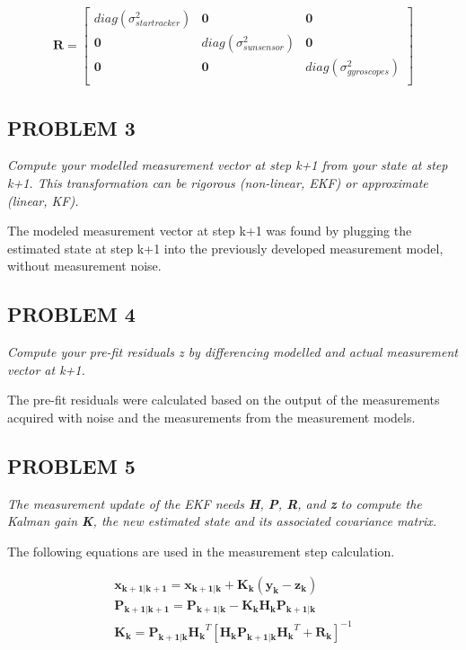 \begin{align*}
    \mathbf{R} = 
    \begin{bmatrix}
        diag(\sigma_{star tracker}^2) & \mathbf{0} & \mathbf{0} \\
        \mathbf{0} & diag(\sigma_{sun sensor}^2) & \mathbf{0} \\
        \mathbf{0} & \mathbf{0} & diag(\sigma_{gyroscopes}^2)\\
    \end{bmatrix}
\end{align*}

\subsection{PROBLEM 3}
\textit{Compute your modelled measurement vector at step k+1 from your state at step k+1. This transformation can be rigorous (non-linear, EKF) or approximate (linear, KF).}

The modeled measurement vector at step k+1 was found by plugging the estimated state at step k+1 into the previously developed measurement model, without measurement noise.

\subsection{PROBLEM 4}
\textit{Compute your pre-fit residuals \textit{z} by differencing modelled and actual measurement vector at k+1.}

The pre-fit residuals were calculated based on the output of the measurements acquired with noise and the measurements from the measurement models.

\subsection{PROBLEM 5}
\textit{The measurement update of the EKF needs \textbf{H}, \textbf{P}, \textbf{R}, and \textbf{z} to compute the Kalman gain \textbf{K}, the new estimated state and its associated covariance matrix.}

The following equations are used in the measurement step calculation.

\begin{align*}
    \mathbf{x_{k+1 | k+1}} = \mathbf{x_{k+1 | k}} + \mathbf{K_k}
    (\mathbf{y_k} - \mathbf{z_k}) \\
    \mathbf{P_{k+1 | k+1}} = \mathbf{P_{k+1 | k}} - 
    \mathbf{K_k} \mathbf{H_k} \mathbf{P_{k+1 | k}} \\
    \mathbf{K_k} = \mathbf{P_{k+1 | k}} \mathbf{H_k}^T [\mathbf{H_k} \mathbf{P_{k+1 | k}} \mathbf{H_k}^T + \mathbf{R_k}]^{-1}
\end{align*}


